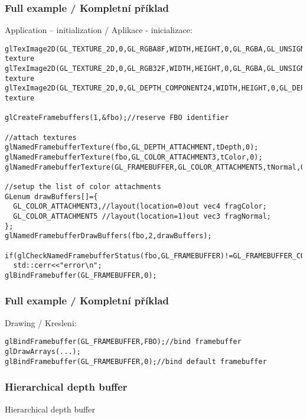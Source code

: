 \begin{frame}[fragile]\frametitle{Full example / Kompletní příklad}\tiny
    Application -- initialization / Aplikace - inicializace:
\begin{verbatim}
glTexImage2D(GL_TEXTURE_2D,0,GL_RGBA8F,WIDTH,HEIGHT,0,GL_RGBA,GL_UNSIGNED_BYTE,NULL);//color texture
glTexImage2D(GL_TEXTURE_2D,0,GL_RGB32F,WIDTH,HEIGHT,0,GL_RGBA,GL_UNSIGNED_BYTE,NULL);//normal texture
glTexImage2D(GL_TEXTURE_2D,0,GL_DEPTH_COMPONENT24,WIDTH,HEIGHT,0,GL_DEPTH_COMPONENT,GL_UNSIGNED_BYTE,NULL);//depth texture

glCreateFramebuffers(1,&fbo);//reserve FBO identifier

//attach textures
glNamedFramebufferTexture(fbo,GL_DEPTH_ATTACHMENT,tDepth,0);
glNamedFramebufferTexture(fbo,GL_COLOR_ATTACHMENT3,tColor,0);
glNamedFramebufferTexture(GL_FRAMEBUFFER,GL_COLOR_ATTACHMENT5,tNormal,0);

//setup the list of color attachments
GLenum drawBuffers[]={
  GL_COLOR_ATTACHMENT3,//layout(location=0)out vec4 fragColor;
  GL_COLOR_ATTACHMENT5 //layout(location=1)out vec3 fragNormal;
};
glNamedFramebufferDrawBuffers(fbo,2,drawBuffers);

if(glCheckNamedFramebufferStatus(fbo,GL_FRAMEBUFFER)!=GL_FRAMEBUFFER_COMPLETE)
  std::cerr<<"error\n";
glBindFramebuffer(GL_FRAMEBUFFER,0);
\end{verbatim}
\end{frame}

\begin{frame}[fragile]\frametitle{Full example / Kompletní příklad}\scriptsize
    Drawing / Kresleni:
\begin{verbatim}
glBindFramebuffer(GL_FRAMEBUFFER,FBO);//bind framebuffer
glDrawArrays(...);
glBindFramebuffer(GL_FRAMEBUFFER,0);//bind default framebuffer
\end{verbatim}

\end{frame}

\begin{frame}\frametitle{Hierarchical depth buffer}
\begin{center}
\Huge {\color{white}Hierarchical depth buffer}
\end{center}
\end{frame}

